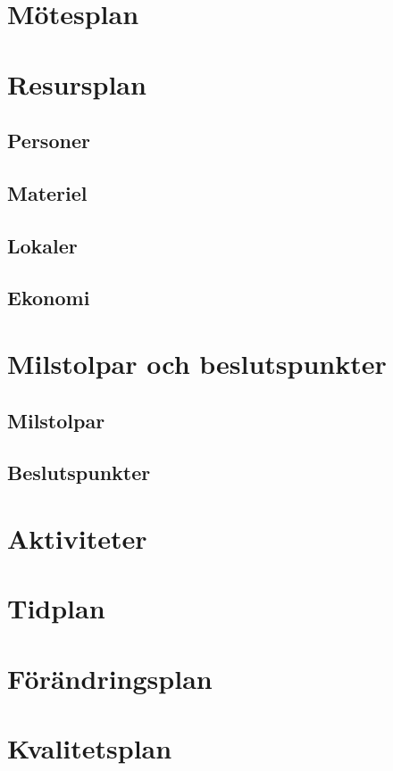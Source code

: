 \documentclass[a4paper,12pt]{article}
\begin{document}
\section{Mötesplan}

\section{Resursplan}	%
\subsection{Personer}
\subsection{Materiel}
\subsection{Lokaler}
\subsection{Ekonomi}

\section{ Milstolpar och beslutspunkter} %

\subsection{Milstolpar}
\subsection{Beslutspunkter}

\section{Aktiviteter}

\section{Tidplan}

\section{Förändringsplan}	%

\section{Kvalitetsplan}	%
\end{document}

